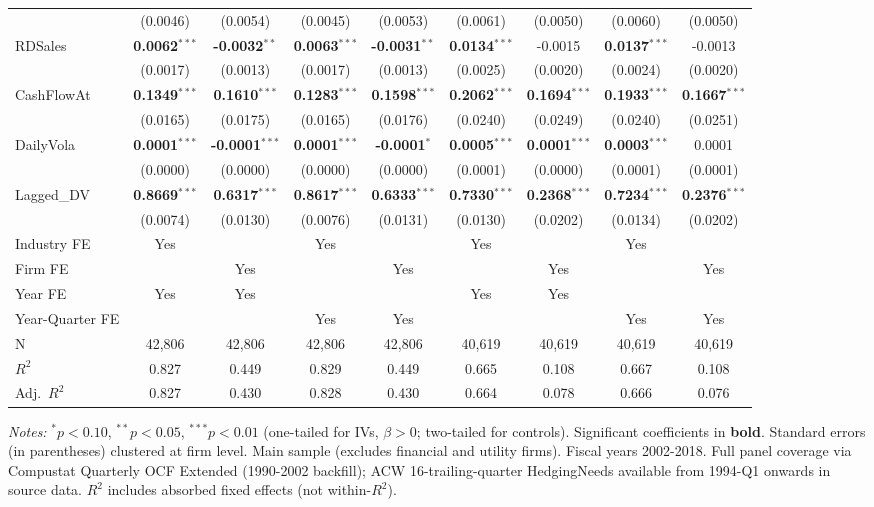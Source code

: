 \begin{landscape}
\begin{table}[H]
\begin{tabular}{lcccccccc}
 & (0.0046) & (0.0054) & (0.0045) & (0.0053) & (0.0061) & (0.0050) & (0.0060) & (0.0050) \\
RDSales & \textbf{0.0062}$^{***}$ & \textbf{-0.0032}$^{**}$ & \textbf{0.0063}$^{***}$ & \textbf{-0.0031}$^{**}$ & \textbf{0.0134}$^{***}$ & -0.0015 & \textbf{0.0137}$^{***}$ & -0.0013 \\
 & (0.0017) & (0.0013) & (0.0017) & (0.0013) & (0.0025) & (0.0020) & (0.0024) & (0.0020) \\
CashFlowAt & \textbf{0.1349}$^{***}$ & \textbf{0.1610}$^{***}$ & \textbf{0.1283}$^{***}$ & \textbf{0.1598}$^{***}$ & \textbf{0.2062}$^{***}$ & \textbf{0.1694}$^{***}$ & \textbf{0.1933}$^{***}$ & \textbf{0.1667}$^{***}$ \\
 & (0.0165) & (0.0175) & (0.0165) & (0.0176) & (0.0240) & (0.0249) & (0.0240) & (0.0251) \\
DailyVola & \textbf{0.0001}$^{***}$ & \textbf{-0.0001}$^{***}$ & \textbf{0.0001}$^{***}$ & \textbf{-0.0001}$^{*}$ & \textbf{0.0005}$^{***}$ & \textbf{0.0001}$^{***}$ & \textbf{0.0003}$^{***}$ & 0.0001 \\
 & (0.0000) & (0.0000) & (0.0000) & (0.0000) & (0.0001) & (0.0000) & (0.0001) & (0.0001) \\
Lagged\_DV & \textbf{0.8669}$^{***}$ & \textbf{0.6317}$^{***}$ & \textbf{0.8617}$^{***}$ & \textbf{0.6333}$^{***}$ & \textbf{0.7330}$^{***}$ & \textbf{0.2368}$^{***}$ & \textbf{0.7234}$^{***}$ & \textbf{0.2376}$^{***}$ \\
 & (0.0074) & (0.0130) & (0.0076) & (0.0131) & (0.0130) & (0.0202) & (0.0134) & (0.0202) \\
\midrule
Industry FE & Yes &  & Yes &  & Yes &  & Yes &  \\
Firm FE &  & Yes &  & Yes &  & Yes &  & Yes \\
Year FE & Yes & Yes &  &  & Yes & Yes &  &  \\
Year-Quarter FE &  &  & Yes & Yes &  &  & Yes & Yes \\
\midrule
N & 42,806 & 42,806 & 42,806 & 42,806 & 40,619 & 40,619 & 40,619 & 40,619 \\
$R^2$ & 0.827 & 0.449 & 0.829 & 0.449 & 0.665 & 0.108 & 0.667 & 0.108 \\
Adj.~$R^2$ & 0.827 & 0.430 & 0.828 & 0.430 & 0.664 & 0.078 & 0.666 & 0.076 \\
\bottomrule
\end{tabular}
\begin{minipage}{\linewidth}
\vspace{2pt}\scriptsize
\textit{Notes:} $^{*}p<0.10$, $^{**}p<0.05$, $^{***}p<0.01$ (one-tailed for IVs, $\beta > 0$; two-tailed for controls).
 Significant coefficients in \textbf{bold}.
 Standard errors (in parentheses) clustered at firm level.
 Main sample (excludes financial and utility firms). Fiscal years 2002-2018. Full panel coverage via Compustat Quarterly OCF Extended (1990-2002 backfill); ACW 16-trailing-quarter HedgingNeeds available from 1994-Q1 onwards in source data.
 $R^2$ includes absorbed fixed effects (not within-$R^2$).
\end{minipage}
\end{table}
\end{landscape}